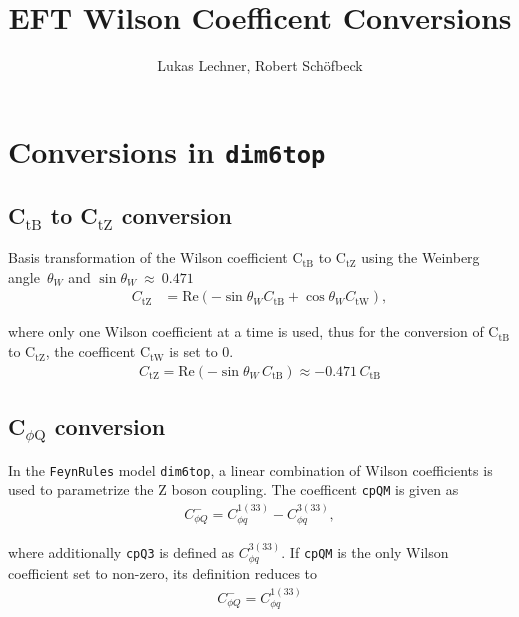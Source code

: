 \documentclass[letterpaper,11pt]{article}
\title{EFT Wilson Coefficent Conversions}
\date{}
\author{Lukas Lechner, Robert Sch\"ofbeck}
\begin{document}
\maketitle
\noindent

\tableofcontents
\clearpage
\section{Conversions in \texttt{dim6top}}
\subsection{C$_\text{tB}$ to C$_\text{tZ}$ conversion}
\label{sec:ctb}
\noindent
Basis transformation of the Wilson coefficient C$_\text{tB}$ to C$_\text{tZ}$ using the Weinberg angle~$\theta_W$ and $\sin\theta_W~\approx~0.471$
\begin{align}
	C_\text{tZ}  &= \textrm{Re}\left( -\sin\theta_{W} C_\text{tB} + \cos\theta_{W} C_\text{tW}\right),
\end{align}

\noindent
where only one Wilson coefficient at a time is used, thus for the conversion of C$_\text{tB}$ to C$_\text{tZ}$, the coefficent C$_\text{tW}$ is set to 0.
\begin{align}
	C_\text{tZ} = \textrm{Re}\left(-\sin\theta_{W}\,C_\text{tB}\right) \approx -0.471\,C_\text{tB}
\end{align}

\noindent
{}

\subsection{C$_{\phi\text{Q}}$ conversion}
\label{sec:cpQM}
\noindent
In the \texttt{FeynRules} model \texttt{dim6top}, a linear combination of Wilson coefficients is used to parametrize the Z boson coupling. The coefficent \texttt{cpQM} is given as
\begin{align}
	C^-_{\phi Q} = C_{\phi q}^{1(33)} - C_{\phi q}^{3(33)},
\end{align}

\noindent
where additionally \texttt{cpQ3} is defined as $C_{\phi q}^{3(33)}$.
If \texttt{cpQM} is the only Wilson coefficient set to non-zero, its definition reduces to
\begin{align}
	C^-_{\phi Q} = C_{\phi q}^{1(33)}
\end{align}
\end{document}
